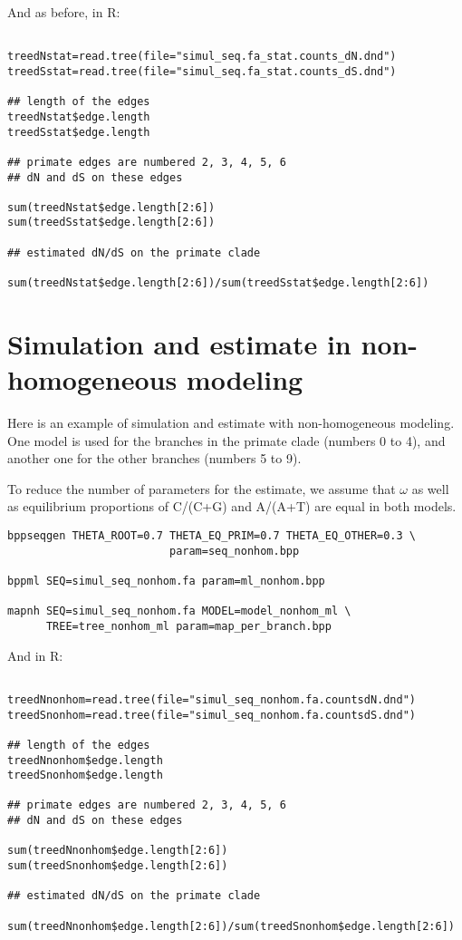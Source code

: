 \documentclass[11pt, a4paper]{article}
\begin{document}
And as before, in R:

\begin{verbatim}

treedNstat=read.tree(file="simul_seq.fa_stat.counts_dN.dnd")  
treedSstat=read.tree(file="simul_seq.fa_stat.counts_dS.dnd")  

## length of the edges 
treedNstat$edge.length
treedSstat$edge.length

## primate edges are numbered 2, 3, 4, 5, 6
## dN and dS on these edges

sum(treedNstat$edge.length[2:6])
sum(treedSstat$edge.length[2:6])

## estimated dN/dS on the primate clade

sum(treedNstat$edge.length[2:6])/sum(treedSstat$edge.length[2:6])

\end{verbatim}


\section*{Simulation and estimate in non-homogeneous modeling}

Here is an example of simulation and estimate with non-homogeneous
modeling. One model is used for the branches in the primate clade
(numbers 0 to 4), and another one for the other branches (numbers 5 to
9).

To reduce the number of parameters for the estimate, we assume that
$\omega$ as well as equilibrium proportions of C/(C+G) and A/(A+T) are
equal in both models.

\begin{verbatim}
bppseqgen THETA_ROOT=0.7 THETA_EQ_PRIM=0.7 THETA_EQ_OTHER=0.3 \
                         param=seq_nonhom.bpp

bppml SEQ=simul_seq_nonhom.fa param=ml_nonhom.bpp

mapnh SEQ=simul_seq_nonhom.fa MODEL=model_nonhom_ml \
      TREE=tree_nonhom_ml param=map_per_branch.bpp

\end{verbatim}

And in R:

\begin{verbatim}

treedNnonhom=read.tree(file="simul_seq_nonhom.fa.countsdN.dnd")  
treedSnonhom=read.tree(file="simul_seq_nonhom.fa.countsdS.dnd")  

## length of the edges 
treedNnonhom$edge.length
treedSnonhom$edge.length

## primate edges are numbered 2, 3, 4, 5, 6
## dN and dS on these edges

sum(treedNnonhom$edge.length[2:6])
sum(treedSnonhom$edge.length[2:6])

## estimated dN/dS on the primate clade

sum(treedNnonhom$edge.length[2:6])/sum(treedSnonhom$edge.length[2:6])

\end{verbatim}
\end{document}
